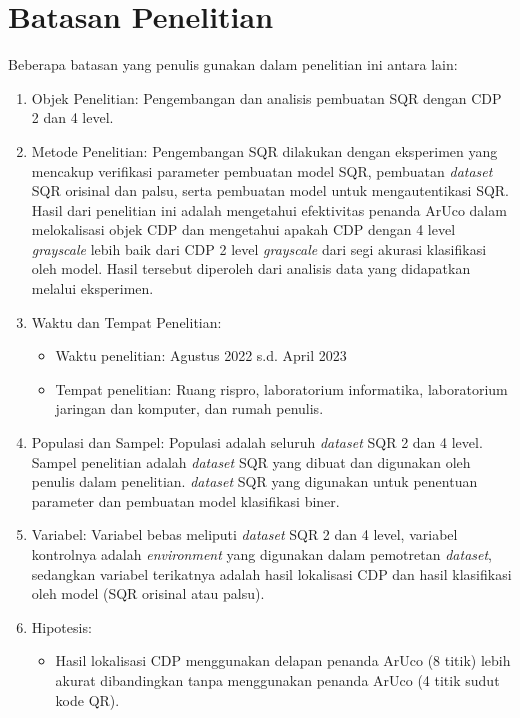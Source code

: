 \section{Batasan Penelitian}
Beberapa batasan yang penulis gunakan dalam penelitian ini antara lain:
\begin{enumerate}
      \item Objek Penelitian: Pengembangan dan analisis pembuatan SQR dengan CDP 2 dan 4 level.
      \item Metode Penelitian: Pengembangan SQR dilakukan dengan eksperimen yang mencakup verifikasi parameter pembuatan model SQR, pembuatan \emph{dataset} SQR orisinal
            dan palsu, serta pembuatan model untuk mengautentikasi SQR. Hasil dari penelitian ini adalah mengetahui efektivitas penanda ArUco dalam melokalisasi objek CDP
            dan mengetahui apakah CDP dengan 4 level \emph{grayscale} lebih baik dari CDP 2 level \emph{grayscale} dari segi akurasi klasifikasi oleh model. Hasil tersebut
            diperoleh dari analisis data yang didapatkan melalui eksperimen.
      \item Waktu dan Tempat Penelitian:
            \begin{itemize}
                  \item Waktu penelitian: Agustus 2022 s.d. April 2023
                  \item Tempat penelitian: Ruang rispro, laboratorium informatika, laboratorium jaringan dan komputer, dan rumah penulis.
            \end{itemize}
      \item Populasi dan Sampel: Populasi adalah seluruh \emph{dataset} SQR 2 dan 4 level. Sampel penelitian adalah \emph{dataset} SQR yang dibuat dan digunakan oleh
            penulis dalam penelitian.
            \emph{dataset} SQR yang digunakan untuk penentuan parameter dan pembuatan model klasifikasi biner.
      \item Variabel: Variabel bebas meliputi \emph{dataset} SQR 2 dan 4 level, variabel kontrolnya adalah \emph{environment} yang digunakan dalam pemotretan
            \emph{dataset}, sedangkan variabel terikatnya adalah hasil lokalisasi CDP dan hasil klasifikasi oleh model (SQR orisinal atau palsu).
      \item Hipotesis:
            \begin{itemize}
                  \item Hasil lokalisasi CDP menggunakan delapan penanda ArUco (8 titik) lebih akurat dibandingkan tanpa menggunakan penanda ArUco (4 titik sudut kode QR).

\end{itemize}
\end{enumerate}
